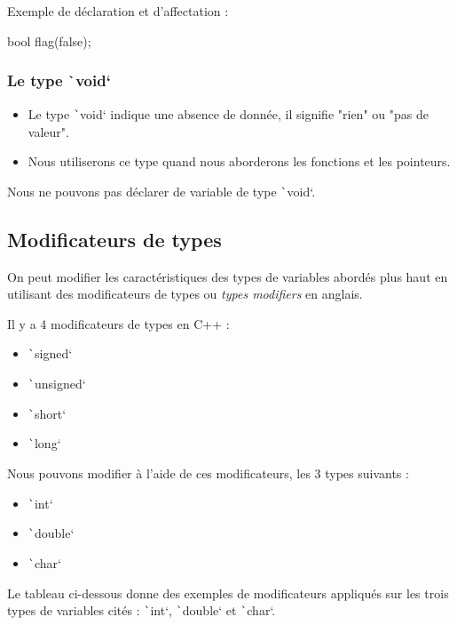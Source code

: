 \documentclass[10pt]{article}
\begin{document}
Exemple de déclaration et d'affectation :

\begin{cppcode}
    bool flag(false);
\end{cppcode}

\subsubsection{Le type \texttt`void`}
\begin{itemize}
    \item Le type \texttt`void` indique une absence de donnée, il signifie "rien" ou "pas de valeur".
    \item Nous utiliserons ce type quand nous aborderons les fonctions et les pointeurs.
\end{itemize}

\begin{noteblock}
    Nous ne pouvons pas déclarer de variable de type \texttt`void`.
\end{noteblock}

\subsection{Modificateurs de types}
On peut modifier les caractéristiques des types de variables abordés plus haut en utilisant des modificateurs de types ou \textit{types modifiers} en anglais.

\smallskip
Il y a 4 modificateurs de types en C++ :
\begin{itemize}
    \item \texttt`signed` 
    \item \texttt`unsigned` 
    \item \texttt`short` 
    \item \texttt`long` 
\end{itemize}

Nous pouvons modifier à l'aide de ces modificateurs, les 3 types suivants :
\begin{itemize}
    \item \texttt`int` 
    \item \texttt`double` 
    \item \texttt`char` 
\end{itemize}

Le tableau ci-dessous donne des exemples de modificateurs appliqués sur les trois types de variables cités : \texttt`int`, \texttt`double` et \texttt`char`.
\end{document}
